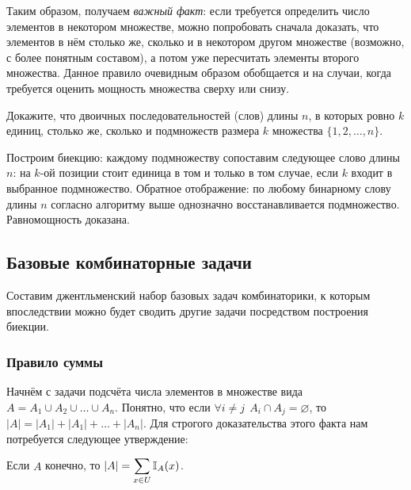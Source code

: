 Таким образом, получаем \emph{важный факт}: если требуется определить число элементов в некотором множестве,
можно попробовать сначала доказать, что элементов в нём столько же, сколько и в некотором другом множестве (возможно, с более понятным составом),
а потом уже пересчитать элементы второго множества.
Данное правило очевидным образом обобщается и на случаи, когда требуется оценить мощность множества сверху или снизу.

\begin{Exercise}[counter=SecExercise, label={exercise:combinatorics:subsets_and_binary_words}]
    \noindent
    Докажите, что двоичных последовательностей (слов) длины $ n $,
    в которых ровно $ k $ единиц, столько же,
    сколько и подмножеств размера $ k $ множества $ \{1, 2, \ldots, n\} $.
\end{Exercise}

\begin{Answer}
    \noindent
    Построим биекцию: каждому подмножеству сопоставим следующее слово длины $ n $:
    на $ k $-ой позиции стоит единица в том и только в том случае, если $ k $ входит в выбранное подмножество.
    Обратное отображение: по любому бинарному слову длины $ n $ согласно алгоритму выше однозначно восстанавливается подмножество.
    Равномощность доказана.
\end{Answer}



\subsection{Базовые комбинаторные задачи}
\label{subsec:combinatorics:basics}

Составим джентльменский набор базовых задач комбинаторики, к которым впоследствии можно будет сводить другие задачи посредством построения биекции.


\subsubsection{Правило суммы}

Начнём с задачи подсчёта числа элементов в множестве вида $ A = A_1 \cup A_2 \cup \ldots \cup A_n $.
Понятно, что если $ \forall i \neq j \;\, A_i \cap A_j = \varnothing $, то $ |A| = |A_1| + |A_1| + \ldots + |A_n| $.
Для строгого доказательства этого факта нам потребуется следующее утверждение:

\begin{statement}
    \label{statement:combinatorics:sum_indicators}
    Если $ A $ конечно, то $ \displaystyle |A| = \sum_{x \in U} \mathbb{I}_A(x) $.
\end{statement}

